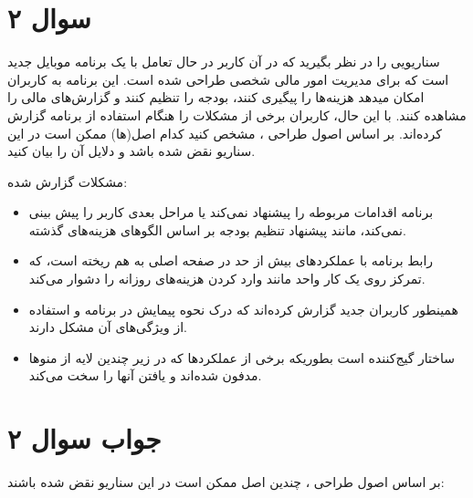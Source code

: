 \section*{سوال ۲}

سناریویی را در نظر بگیرید که در آن کاربر در حال تعامل با یک برنامه موبایل جدید است که برای مدیریت امور مالی شخصی طراحی شده است. این برنامه به کاربران امکان میدهد هزینه‌ها را پیگیری کنند، بودجه را تنظیم کنند و گزارش‌های مالی را مشاهده کنند. با این حال، کاربران برخی از مشکلات را هنگام استفاده از برنامه گزارش کرده‌اند. بر اساس اصول طراحی
 ، مشخص کنید کدام اصل(ها) ممکن است در این سناریو نقض شده باشد و دلایل آن را بیان کنید.

مشکلات گزارش شده:
\begin{itemize}
	\item برنامه اقدامات مربوطه را پیشنهاد نمی‌کند یا مراحل بعدی کاربر را پیش بینی نمی‌کند، مانند پیشنهاد تنظیم بودجه بر اساس الگوهای هزینه‌های گذشته.
	\item رابط برنامه با عملکردهای بیش از حد در صفحه اصلی به هم ریخته است، که تمرکز روی یک کار واحد مانند وارد کردن هزینه‌های روزانه را دشوار می‌کند.
	\item همینطور کاربران جدید گزارش کرده‌اند که درک نحوه پیمایش در برنامه و استفاده از ویژگی‌های آن مشکل دارند.
	\item ساختار  گیج‌کننده است بطوریکه برخی از عملکردها که در زیر چندین لایه از منوها مدفون شده‌اند و یافتن آنها را سخت می‌کند.
\end{itemize}

\section*{جواب سوال ۲}

بر اساس اصول طراحی ، چندین اصل ممکن است در این سناریو نقض شده باشند:

